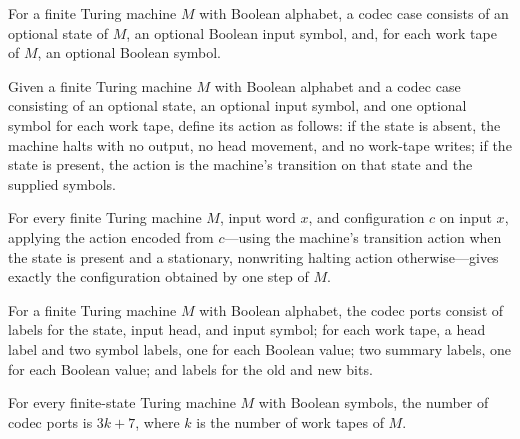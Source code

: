 \begin{definition}
\label{Complexity.CodecCase}
\leanok
{}
For a finite Turing machine $M$ with Boolean alphabet, a codec case consists of an
optional state of $M$, an optional Boolean input symbol, and, for each work tape of $M$,
an optional Boolean symbol.
\end{definition}

\begin{definition}
\label{Complexity.codecAction}
\leanok
{}
Given a finite Turing machine $M$ with Boolean alphabet and a codec case consisting of
an optional state, an optional input symbol, and one optional symbol for each work tape,
define its action as follows: if the state is absent, the machine halts with no output,
no head movement, and no work-tape writes; if the state is present, the action is the
machine's transition on that state and the supplied symbols.
\end{definition}

\begin{theorem}
\label{Complexity.codecAction_apply}
\leanok
{}
For every finite Turing machine $M$, input word $x$, and configuration $c$ on input $x$,
applying the action encoded from $c$—using the machine's transition action when the
state is present and a stationary, nonwriting halting action otherwise—gives exactly the
configuration obtained by one step of $M$.
\end{theorem}

\begin{definition}
\label{Complexity.CodecPort}
\leanok
{}
For a finite Turing machine $M$ with Boolean alphabet, the codec ports consist of labels
for the state, input head, and input symbol; for each work tape, a head label and two
symbol labels, one for each Boolean value; two summary labels, one for each Boolean
value; and labels for the old and new bits.
\end{definition}

\begin{theorem}
\label{Complexity.codecPort_card}
\leanok
{}
For every finite-state Turing machine $M$ with Boolean symbols, the number of codec
ports is $3k+7$, where $k$ is the number of work tapes of $M$.
\end{theorem}


